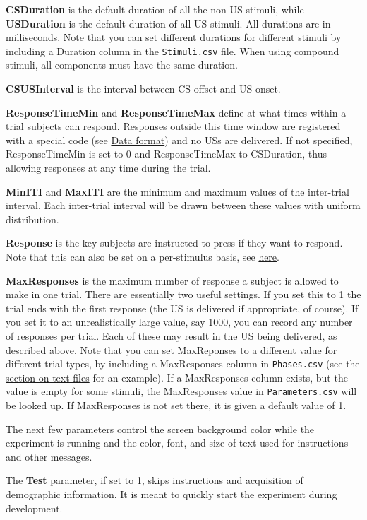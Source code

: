 \documentclass[11pt,]{article}
\begin{document}
\textbf{CSDuration} is the default duration of all the non-US stimuli,
while \textbf{USDuration} is the default duration of all US stimuli. All
durations are in milliseconds. Note that you can set different durations
for different stimuli by including a Duration column in the
\texttt{Stimuli.csv} file. When using compound stimuli, all components
must have the same duration.

\textbf{CSUSInterval} is the interval between CS offset and US onset.

\textbf{ResponseTimeMin} and \textbf{ResponseTimeMax} define at what
times within a trial subjects can respond. Responses outside this time
window are registered with a special code (see
\hyperref[data-format]{Data format}) and no USs are delivered. If not
specified, ResponseTimeMin is set to 0 and ResponseTimeMax to
CSDuration, thus allowing responses at any time during the trial.

\textbf{MinITI} and \textbf{MaxITI} are the minimum and maximum values
of the inter-trial interval. Each inter-trial interval will be drawn
between these values with uniform distribution.

\textbf{Response} is the key subjects are instructed to press if they
want to respond. Note that this can also be set on a per-stimulus basis,
see \hyperref[responses]{here}.

\label{maxresponses} \textbf{MaxResponses} is the maximum number of
response a subject is allowed to make in one trial. There are
essentially two useful settings. If you set this to 1 the trial ends
with the first response (the US is delivered if appropriate, of course).
If you set it to an unrealistically large value, say 1000, you can
record any number of responses per trial. Each of these may result in
the US being delivered, as described above. Note that you can set
MaxReponses to a different value for different trial types, by including
a MaxResponses column in \texttt{Phases.csv} (see the
\hyperref[textfiles]{section on text files} for an example). If a
MaxResponses column exists, but the value is empty for some stimuli, the
MaxResponses value in \texttt{Parameters.csv} will be looked up. If
MaxResponses is not set there, it is given a default value of 1.

The next few parameters control the screen background color while the
experiment is running and the color, font, and size of text used for
instructions and other messages.

The \textbf{Test} parameter, if set to 1, skips instructions and
acquisition of demographic information. It is meant to quickly start the
experiment during development.
\end{document}
